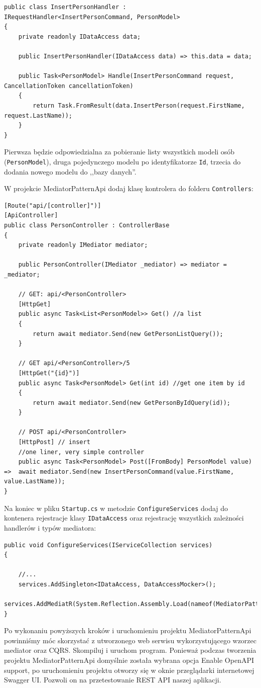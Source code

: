 \begin{lstlisting}
public class InsertPersonHandler : IRequestHandler<InsertPersonCommand, PersonModel>
{
	private readonly IDataAccess data;
	
	public InsertPersonHandler(IDataAccess data) => this.data = data;
	
	public Task<PersonModel> Handle(InsertPersonCommand request, CancellationToken cancellationToken)
	{
		return Task.FromResult(data.InsertPerson(request.FirstName, request.LastName));
	}
}
\end{lstlisting}
Pierwsza będzie odpowiedzialna za pobieranie listy wszystkich modeli osób (\texttt{PersonModel}), druga pojedynczego modelu po identyfikatorze \texttt{Id}, trzecia do dodania nowego modelu do ,,bazy danych''.


W projekcie MediatorPatternApi dodaj klasę kontrolera do folderu \texttt{Controllers}:
\begin{lstlisting}
[Route("api/[controller]")]
[ApiController]
public class PersonController : ControllerBase
{
	private readonly IMediator mediator;
	
	public PersonController(IMediator _mediator) => mediator = _mediator;
	
	// GET: api/<PersonController>
	[HttpGet]
	public async Task<List<PersonModel>> Get() //a list
	{
		return await mediator.Send(new GetPersonListQuery());
	}
	
	// GET api/<PersonController>/5
	[HttpGet("{id}")]
	public async Task<PersonModel> Get(int id) //get one item by id
	{
		return await mediator.Send(new GetPersonByIdQuery(id));
	}
	
	// POST api/<PersonController>
	[HttpPost] // insert
	//one liner, very simple controller
	public async Task<PersonModel> Post([FromBody] PersonModel value) =>  await mediator.Send(new InsertPersonCommand(value.FirstName, value.LastName));
}
\end{lstlisting}

Na koniec w pliku \texttt{Startup.cs} w metodzie \texttt{ConfigureServices} dodaj do kontenera rejestracje klasy \texttt{IDataAccess} oraz rejestrację wszystkich zależności handlerów i typów mediatora:
\begin{lstlisting}
public void ConfigureServices(IServiceCollection services)
{
	
	//...	
	services.AddSingleton<IDataAccess, DataAccessMocker>();
	services.AddMediatR(System.Reflection.Assembly.Load(nameof(MediatorPatternLib)));
}
\end{lstlisting}

Po wykonaniu powyższych kroków i uruchomieniu projektu MediatorPatternApi powinniśmy móc skorzystać z utworzonego web serwisu wykorzystującego wzorzec mediator oraz CQRS. Skompiluj i uruchom program. Ponieważ podczas tworzenia projektu MediatorPatternApi domyślnie została wybrana opcja Enable OpenAPI support, po uruchomieniu projektu otworzy się w oknie przeglądarki internetowej Swagger UI. Pozwoli on na przetestowanie REST API naszej aplikacji.